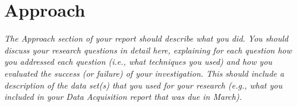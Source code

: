 \section{Approach} 

\emph{The Approach section of your report should describe what you did. You should discuss your research questions in detail here, explaining for each question how you addressed each question (i.e., what techniques you used) and how you evaluated the success (or failure) of your investigation. This should include a description of the data set(s) that you used for your research (e.g., what you included in your Data Acquisition report that was due in March).}
